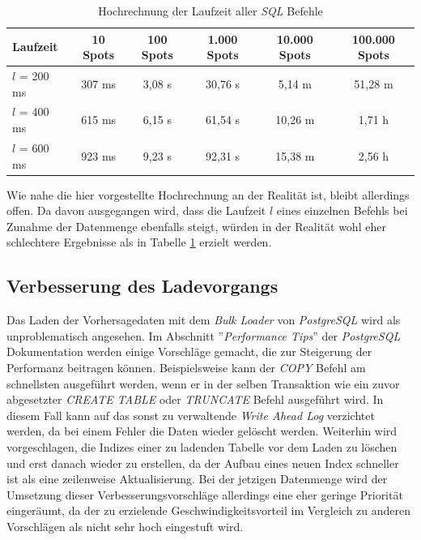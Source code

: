 \begin{table}[h]
  \centering
  {\sf
    \footnotesize
    \begin{longtable}{l|c|c|c|c|c}

      \toprule
      \textbf{Laufzeit} & \textbf{10 Spots} & \textbf{100 Spots} & \textbf{1.000 Spots} & \textbf{10.000 Spots} & \textbf{100.000 Spots} \\
      \midrule
      $l$ = 200 ms & 307 ms & 3,08 s & 30,76 s &  5,14 m &  51,28 m \\
      $l$ = 400 ms & 615 ms & 6,15 s & 61,54 s & 10,26 m & 1,71 h \\
      $l$ = 600 ms & 923 ms & 9,23 s & 92,31 s & 15,38 m & 2,56 h \\
      \bottomrule

    \end{longtable}
  }

  \caption{Hochrechnung der Laufzeit aller \textit{SQL} Befehle}
  \label{tab:sql_laufzeit}

\end{table}

Wie nahe die hier vorgestellte Hochrechnung an der Realität ist,
bleibt allerdings offen. Da davon ausgegangen wird, dass die Laufzeit
$l$ eines einzelnen Befehls bei Zunahme der Datenmenge ebenfalls
steigt, würden in der Realität wohl eher schlechtere Ergebnisse als in
Tabelle \ref{tab:sql_laufzeit} erzielt werden.

\subsection{Verbesserung des Ladevorgangs}
Das Laden der Vorhersagedaten mit dem \textit{Bulk Loader} von
\textit{PostgreSQL} wird als unproblematisch angesehen. Im Abschnitt
''\textit{Performance Tips}'' \cite{postgresql:performance} der
\textit{PostgreSQL} Dokumentation werden einige Vorschläge gemacht,
die zur Steigerung der Performanz beitragen können. Beispielsweise
kann der \textit{COPY} Befehl am schnellsten ausgeführt werden, wenn
er in der selben Transaktion wie ein zuvor abgesetzter \textit{CREATE
  TABLE} oder \textit{TRUNCATE} Befehl ausgeführt wird. In diesem Fall
kann auf das sonst zu verwaltende \textit{Write Ahead Log} verzichtet
werden, da bei einem Fehler die Daten wieder gelöscht
werden. Weiterhin wird vorgeschlagen, die Indizes einer zu ladenden
Tabelle vor dem Laden zu löschen und erst danach wieder zu erstellen,
da der Aufbau eines neuen Index schneller ist als eine zeilenweise
Aktualisierung. Bei der jetzigen Datenmenge wird der Umsetzung dieser
Verbesserungsvorschläge allerdings eine eher geringe Priorität
eingeräumt, da der zu erzielende Geschwindigkeitsvorteil im Vergleich
zu anderen Vorschlägen als nicht sehr hoch eingestuft wird.

